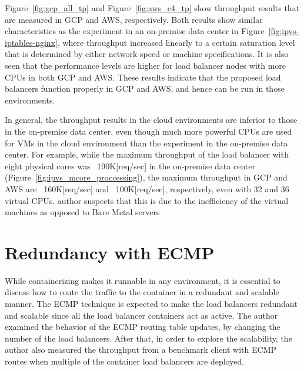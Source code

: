 Figure~\ref{fig:gcp_all_tp} and Figure~\ref{fig:aws_c4_tp} show throughput results that are measured in GCP and AWS, respectively. 
Both results show similar characteristics as the experiment in an on-premise data center in Figure~\ref{fig:ipvs-iptables-nginx}, where throughput increased linearly to a certain saturation level that is determined by either network speed or machine specifications.
It is also seen that the performance levels are higher for load balancer nodes with more CPUs in both GCP and AWS. 
These results indicate that the proposed  load balancers function properly in GCP and AWS, and hence can be run in those environments.

In general, the throughput results in the cloud environments are inferior to those in the on-premise data center, even though much more powerful CPUs are used for VMs in the cloud environment than the experiment in the on-premise data center.
For example, while the maximum throughput of the  load balancer with eight physical cores was ~190K[req/sec] in the on-premise data center (Figure~\ref{fig:ipvs_mcore_proccessing}), the maximum throughput in GCP and AWS are ~160K[req/sec] and ~100K[req/sec], respectively, even with 32 and 36 virtual CPUs.
 author suspects that this is due to the inefficiency of the virtual machines as opposed to Bare Metal servers

\FloatBarrier

\section{Redundancy with ECMP}

While containerizing  makes it runnable in any environment, it is essential to discuss how to route the traffic to the  container in a redundant and scalable manner.
The ECMP technique is expected to make the load balancers redundant and scalable since all the load balancer containers act as active.
The author examined the behavior of the ECMP routing table updates, by changing the number of the load balancers.
After that, in order to explore the scalability, the author also measured the throughput from a benchmark client with ECMP routes when multiple of the  container load balancers are deployed.

